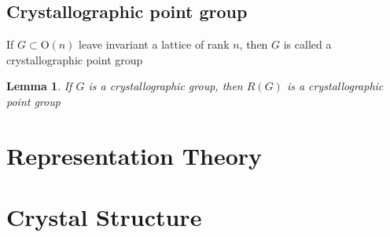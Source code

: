 \documentclass{amsart}
\newtheorem{lemma}{Lemma}
\begin{document}
\subsection*{Crystallographic point group}
If $G\subset \text{O}(n)$ leave invariant a lattice of rank $n$, then $G$ is called a crystallographic point group

\begin{lemma}
    If $G$ is a crystallographic group, then $R(G)$ is a crystallographic point group
\end{lemma}


\newpage
\section{Representation Theory}

\newpage
\section{Crystal Structure}
\end{document}
